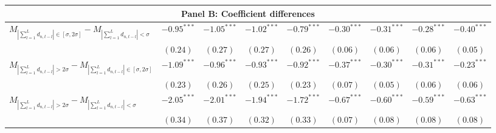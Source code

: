 \begin{tabular}{lcccccccc}
   \hline \multicolumn{9}{c}{Panel B: Coefficient differences} \\
 \hline 
$M_{\left|\sum_{l=1}^L d_{n,t-l}\right| \in [\sigma, 2\sigma]}-M_{\left|\sum_{l=1}^L d_{n,t-l}\right| < \sigma}$ & $-0.95^{***}$ & $-1.05^{***}$ & $-1.02^{***}$ & $-0.79^{***}$ & $-0.30^{***}$ & $-0.31^{***}$ & $-0.28^{***}$ & $-0.40^{***}$ \\ 
   & $(0.24)$ & $(0.27)$ & $(0.27)$ & $(0.26)$ & $(0.06)$ & $(0.06)$ & $(0.06)$ & $(0.05)$ \\ 
  $M_{\left|\sum_{l=1}^L d_{n,t-l}\right| > 2 \sigma}-M_{\left|\sum_{l=1}^L d_{n,t-l}\right| \in [\sigma, 2\sigma]}$ & $-1.09^{***}$ & $-0.96^{***}$ & $-0.93^{***}$ & $-0.92^{***}$ & $-0.37^{***}$ & $-0.30^{***}$ & $-0.31^{***}$ & $-0.23^{***}$ \\ 
   & $(0.23)$ & $(0.26)$ & $(0.25)$ & $(0.23)$ & $(0.07)$ & $(0.05)$ & $(0.06)$ & $(0.06)$ \\ 
  $M_{\left|\sum_{l=1}^L d_{n,t-l}\right| > 2 \sigma}-M_{\left|\sum_{l=1}^L d_{n,t-l}\right| < \sigma}$ & $-2.05^{***}$ & $-2.01^{***}$ & $-1.94^{***}$ & $-1.72^{***}$ & $-0.67^{***}$ & $-0.60^{***}$ & $-0.59^{***}$ & $-0.63^{***}$ \\ 
   & $(0.34)$ & $(0.37)$ & $(0.32)$ & $(0.33)$ & $(0.07)$ & $(0.08)$ & $(0.08)$ & $(0.08)$ \\ 
   \hline 
\end{tabular}
